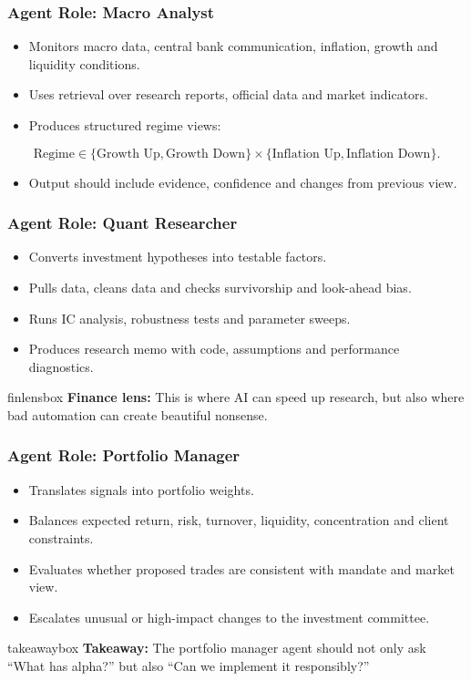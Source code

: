 \documentclass[aspectratio=169,12pt]{beamer}
\newcommand{\currentframetitle}{}
\newcommand{\slideTitle}[1]{\gdef\currentframetitle{#1}\frametitle{#1}}
\newcommand{\finlens}[1]{%
  \vspace{0.08cm}
  \begin{beamercolorbox}[wd=\linewidth,rounded=true,sep=0.18cm]{finlensbox}
    \small\textbf{Finance lens:} #1
  \end{beamercolorbox}%
}
\newcommand{\takeaway}[1]{%
  \vspace{0.08cm}
  \begin{beamercolorbox}[wd=\linewidth,rounded=true,sep=0.18cm]{takeawaybox}
    \small\textbf{Takeaway:} #1
  \end{beamercolorbox}%
}
\begin{document}
\begin{frame}
\slideTitle{Agent Role: Macro Analyst}
\begin{itemize}
  \item Monitors macro data, central bank communication, inflation, growth and liquidity conditions.
  \item Uses retrieval over research reports, official data and market indicators.
  \item Produces structured regime views:
\end{itemize}
\[
\text{Regime} \in \{\text{Growth Up},\text{Growth Down}\}\times\{\text{Inflation Up},\text{Inflation Down}\}.
\]
\begin{itemize}
  \item Output should include evidence, confidence and changes from previous view.
\end{itemize}
\end{frame}

\begin{frame}
\slideTitle{Agent Role: Quant Researcher}
\begin{itemize}
  \item Converts investment hypotheses into testable factors.
  \item Pulls data, cleans data and checks survivorship and look-ahead bias.
  \item Runs IC analysis, robustness tests and parameter sweeps.
  \item Produces research memo with code, assumptions and performance diagnostics.
\end{itemize}
\finlens{This is where AI can speed up research, but also where bad automation can create beautiful nonsense.}
\end{frame}

\begin{frame}
\slideTitle{Agent Role: Portfolio Manager}
\begin{itemize}
  \item Translates signals into portfolio weights.
  \item Balances expected return, risk, turnover, liquidity, concentration and client constraints.
  \item Evaluates whether proposed trades are consistent with mandate and market view.
  \item Escalates unusual or high-impact changes to the investment committee.
\end{itemize}
\takeaway{The portfolio manager agent should not only ask ``What has alpha?'' but also ``Can we implement it responsibly?''}
\end{frame}
\end{document}
